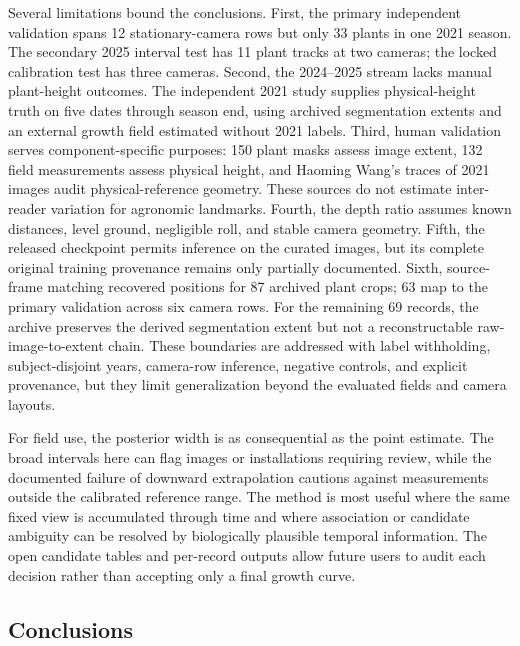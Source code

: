 \documentclass[12pt,letterpaper]{article}
\begin{document}
Several limitations bound the conclusions. First, the primary independent validation spans 12 stationary-camera rows but only 33 plants in one 2021 season. The secondary 2025 interval test has 11 plant tracks at two cameras; the locked calibration test has three cameras. Second, the 2024--2025 stream lacks manual plant-height outcomes. The independent 2021 study supplies physical-height truth on five dates through season end, using archived segmentation extents and an external growth field estimated without 2021 labels. Third, human validation serves component-specific purposes: 150 plant masks assess image extent, 132 field measurements assess physical height, and Haoming Wang's \ManualPoleAnnotations{} traces of \ManualPoleImages{} 2021 images audit physical-reference geometry. These sources do not estimate inter-reader variation for agronomic landmarks. Fourth, the depth ratio assumes known distances, level ground, negligible roll, and stable camera geometry. Fifth, the released checkpoint permits inference on the curated images, but its complete original training provenance remains only partially documented. Sixth, source-frame matching recovered positions for 87 archived plant crops; 63 map to the primary validation across six camera rows. For the remaining 69 records, the archive preserves the derived segmentation extent but not a reconstructable raw-image-to-extent chain. These boundaries are addressed with label withholding, subject-disjoint years, camera-row inference, negative controls, and explicit provenance, but they limit generalization beyond the evaluated fields and camera layouts.

For field use, the posterior width is as consequential as the point estimate. The broad intervals here can flag images or installations requiring review, while the documented failure of downward extrapolation cautions against measurements outside the calibrated reference range. The method is most useful where the same fixed view is accumulated through time and where association or candidate ambiguity can be resolved by biologically plausible temporal information. The open candidate tables and per-record outputs allow future users to audit each decision rather than accepting only a final growth curve.

\subsection{Conclusions}
\end{document}
